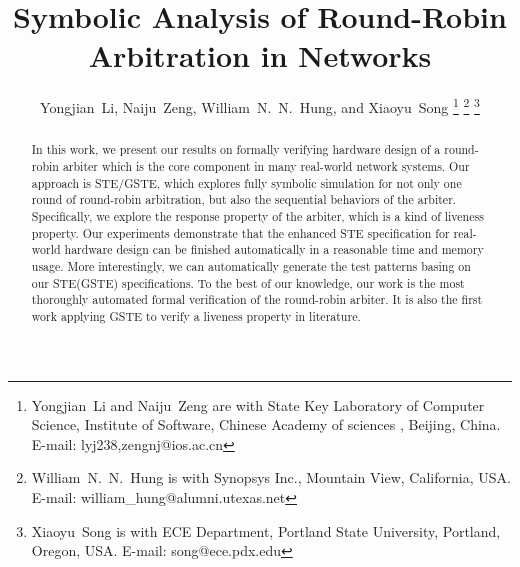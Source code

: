 \documentclass[final]{IEEEtran}
\begin{document}
\title{Symbolic Analysis of Round-Robin Arbitration in Networks
}


\author{Yongjian~Li, Naiju~Zeng, William~N.~N.~Hung, and Xiaoyu~Song \thanks{%
Yongjian~Li and Naiju~Zeng are with State Key Laboratory of Computer
Science, Institute of Software, Chinese Academy of sciences ,
Beijing, China.
E-mail: lyj238,zengnj@ios.ac.cn}%
\thanks{William~N.~N.~Hung is with Synopsys Inc., Mountain View,
California, USA.
E-mail: william\_hung@alumni.utexas.net}%
\thanks{Xiaoyu~Song is with ECE Department, Portland State
University, Portland, Oregon, USA. E-mail: song@ece.pdx.edu} }


\maketitle


\begin{abstract}
In this work, we present our results on formally verifying hardware
design of a round-robin arbiter which is the core component in many
real-world network systems. Our approach is  STE/GSTE, which
explores fully symbolic simulation for not only one round of
round-robin arbitration, but also the sequential behaviors of the
arbiter. Specifically, we explore the response property of the
arbiter, which is a kind of liveness property. Our experiments
demonstrate that the enhanced STE specification for real-world
hardware design can be finished automatically in a reasonable time
and memory usage. More interestingly, we can automatically generate
the test patterns basing on our STE(GSTE) specifications. To the
best of our knowledge, our work is the most thoroughly automated
formal verification of the round-robin arbiter. It is also the first
work applying GSTE to verify a liveness property in literature.
\end{abstract}
\end{document}
